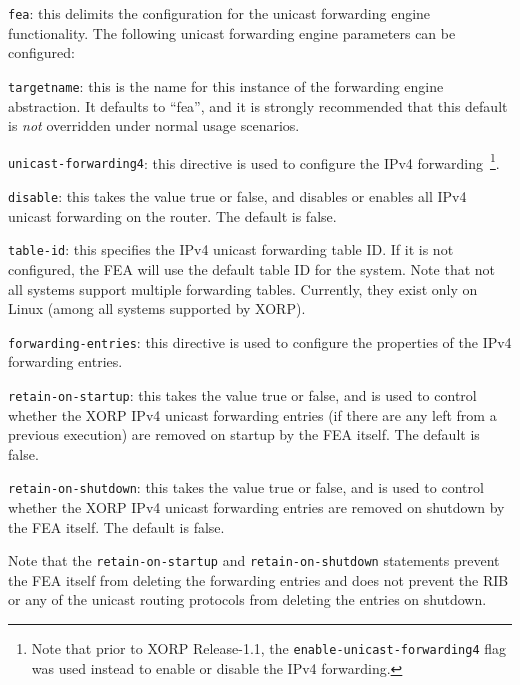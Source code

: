 \begin{description}
\item{\tt fea}: this delimits the configuration for the unicast
  forwarding engine functionality. 
  The following unicast forwarding engine parameters can be configured:
\begin{description}
\item{\tt targetname}: this is the name for this instance of the
  forwarding engine abstraction.  It defaults to ``{\stt fea}'', and
  it is strongly recommended that this default is {\it not} overridden
  under normal usage scenarios.
\end{description}

\item{\tt unicast-forwarding4}: this directive is used to configure the IPv4
  forwarding~\footnote{Note that prior to XORP Release-1.1, the
  {\tt enable-unicast-forwarding4} flag was used instead to enable or disable
  the IPv4 forwarding.}.
\begin{description}
\item{\tt disable}: this takes the value {\stt true} or {\stt false},
  and disables or enables all IPv4 unicast forwarding on the router.
  The default is {\stt false}.
\item{\tt table-id}: this specifies the IPv4 unicast forwarding table ID.
  If it is not configured, the FEA will use the default table ID for the
  system. Note that not all systems support multiple forwarding tables.
  Currently, they exist only on Linux (among all systems supported by XORP).

\item{\tt forwarding-entries}: this directive is used to configure the
  properties of the IPv4 forwarding entries.
\begin{description}
\item{\tt retain-on-startup}: this takes the value {\stt true} or
  {\stt false}, and is used to control whether the XORP IPv4 unicast
  forwarding entries (if there are any left from a previous execution)
  are removed on startup by the FEA itself. The default is {\stt false}.
\item{\tt retain-on-shutdown}: this takes the value {\stt true} or
  {\stt false}, and is used to control whether the XORP IPv4 unicast
  forwarding entries are removed on shutdown by the FEA itself.
  The default is {\stt false}.
\end{description}
   Note that the {\tt retain-on-startup} and {\tt retain-on-shutdown}
   statements prevent the FEA itself from deleting the forwarding
   entries and does not prevent the RIB or any of the unicast routing
   protocols from deleting the entries on shutdown.
\end{description}


\end{description}
